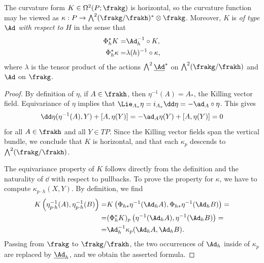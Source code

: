 \begin{lem}\label{lem 1.5.1 Cap}
    The curvature form $K\in\Omega^2(P;\frakg)$ is horizontal, so the curvature function may be viewed as $\kappa:P\to \bigwedge^2(\frakg\slash\frakh)^\ast\otimes\frakg$. Moreover, $K$ is \emph{of type $\Ad$ with respect to $H$} in the sense that 
    \begin{align}
        \Phi_h^\ast K=&\Ad_h^{-1}\circ K,\\
        \Phi_h^\ast\kappa=&\lambda(h)^{-1}\circ\kappa,
    \end{align}
    where $\lambda$ is the tensor product of the actions $\bigwedge^2 \underline{\Ad}^\ast$ on $\bigwedge^2(\frakg\slash\frakh)$ and $\Ad$ on $\frakg$.
\end{lem}
\begin{proof}
    By definition of $\eta$, if $A\in\frakh$, then $\eta^{-1}(A)=A_\ast$, the Killing vector field. Equivariance of $\eta$ implies that $\Lie_{A_\ast}\eta=i_{A_\ast}\dd\eta=-\ad_A\circ\eta$. This gives 
    \[\dd\eta(\eta^{-1}(A),Y)+[A,\eta(Y)]=-\ad_{A}\eta(Y)+[A,\eta(Y)]=0\]
    for all $A\in\frakh$ and all $Y\in TP$. Since the Killing vector fields span the vertical bundle, we conclude that $K$ is horizontal, and that each $\kappa_p$ descends to $\bigwedge^2(\frakg\slash\frakh)$.
    
    The equivariance property of $K$ follows directly from the definition and the naturality of $\dd$ with respect to pullbacks. To prove the property for $\kappa$, we have to compute $\kappa_{p\cdot h}(X,Y)$. By definition, we find 
    \begin{align}
        K\left(\eta_{p\cdot h}^{-1}(A),\eta_{p\cdot h}^{-1}(B)\right)=&K\left(\Phi_{h\ast}\eta^{-1}(\Ad_h A),\Phi_{h\ast}\eta^{-1}(\Ad_h B)\right)=\\
        =&(\Phi_h^\ast K)_p \left(\eta^{-1}(\Ad_h A),\eta^{-1}(\Ad_h B)\right)=\\
        =&\Ad_h^{-1}\kappa_p(\Ad_h A,\Ad_h B).
    \end{align}
    Passing from $\frakg$ to $\frakg\slash\frakh$, the two occurrences of $\Ad_h$ inside of $\kappa_p$ are replaced by $\underline{\Ad}_h$, and we obtain the asserted formula.
\end{proof}



